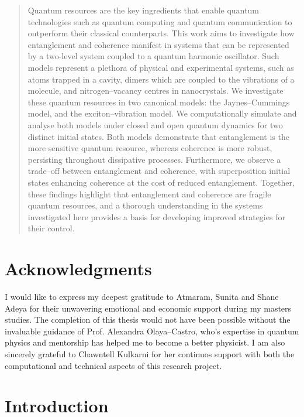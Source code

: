 \documentclass[11pt]{article}
\begin{document}
\vspace{\fill}
\begin{abstract}
    Quantum resources are the key ingredients that enable quantum technologies such as quantum computing and quantum communication to outperform their classical counterparts. This work aims to investigate how entanglement and coherence manifest in systems that can be represented by a two-level system coupled to a quantum harmonic oscillator. Such models represent a plethora of physical and experimental systems, such as atoms trapped in a cavity, dimers which are coupled to the vibrations of a molecule, and nitrogen--vacancy centres in nanocrystals. We investigate these quantum resources in two canonical models: the Jaynes--Cummings model, and the exciton--vibration model. We computationally simulate and analyse both models under closed and open quantum dynamics for two distinct initial states. Both models demonstrate that entanglement is the more sensitive quantum resource, whereas coherence is more robust, persisting throughout dissipative processes. Furthermore, we observe a trade--off between entanglement and coherence, with superposition initial states enhancing coherence at the cost of reduced entanglement. Together, these findings highlight that entanglement and coherence are fragile quantum resources, and a thorough understanding in the systems investigated here provides a basis for developing improved strategies for their control.
\end{abstract}
\vspace{\fill}

\newpage
\section*{Acknowledgments}
I would like to express my deepest gratitude to Atmaram, Sunita and Shane Adeya for their unwavering emotional and economic support during my masters studies. The completion of this thesis would not have been possible without the invaluable guidance of Prof. Alexandra Olaya--Castro, who's expertise in quantum physics and mentorship has helped me to become a better physicist. I am also sincerely grateful to Chawntell Kulkarni for her continuos support with both the computational and technical aspects of this research project.  
\newpage
\tableofcontents
\newpage
{}
\section{Introduction}
\end{document}
